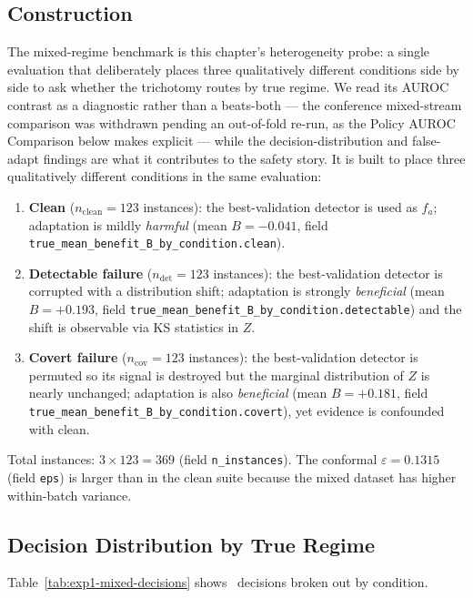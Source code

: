 \subsection{Construction}

The mixed-regime benchmark is this chapter's heterogeneity probe: a single evaluation that
deliberately places three qualitatively different conditions side by side to ask whether
the trichotomy routes by true regime.  We read its AUROC contrast as a diagnostic rather
than a beats-both --- the conference mixed-stream comparison was withdrawn pending an
out-of-fold re-run, as the Policy AUROC Comparison below makes explicit --- while the
decision-distribution and false-adapt findings are what it contributes to the safety
story.  It is built to place three qualitatively different conditions in the same
evaluation:
\begin{enumerate}
  \item \textbf{Clean} ($n_\text{clean} = 123$ instances): the best-validation detector is
    used as $f_a$; adaptation is mildly \emph{harmful} (mean $B = -0.041$, field
    \texttt{true\_mean\_benefit\_B\_by\_condition.clean}).
  \item \textbf{Detectable failure} ($n_\text{det} = 123$ instances): the best-validation
    detector is corrupted with a distribution shift; adaptation is strongly
    \emph{beneficial} (mean $B = +0.193$, field
    \texttt{true\_mean\_benefit\_B\_by\_condition.detectable}) and the shift is observable
    via KS statistics in $Z$.
  \item \textbf{Covert failure} ($n_\text{cov} = 123$ instances): the best-validation
    detector is permuted so its signal is destroyed but the marginal distribution of $Z$
    is nearly unchanged; adaptation is also \emph{beneficial} (mean $B = +0.181$, field
    \texttt{true\_mean\_benefit\_B\_by\_condition.covert}), yet evidence is confounded
    with clean.
\end{enumerate}
Total instances: $3 \times 123 = 369$ (field \texttt{n\_instances}).  The conformal
$\varepsilon = 0.1315$ (field \texttt{eps}) is larger than in the clean suite because
the mixed dataset has higher within-batch variance.

\subsection{Decision Distribution by True Regime}

Table~\ref{tab:exp1-mixed-decisions} shows \KGA\ decisions broken out by condition.


